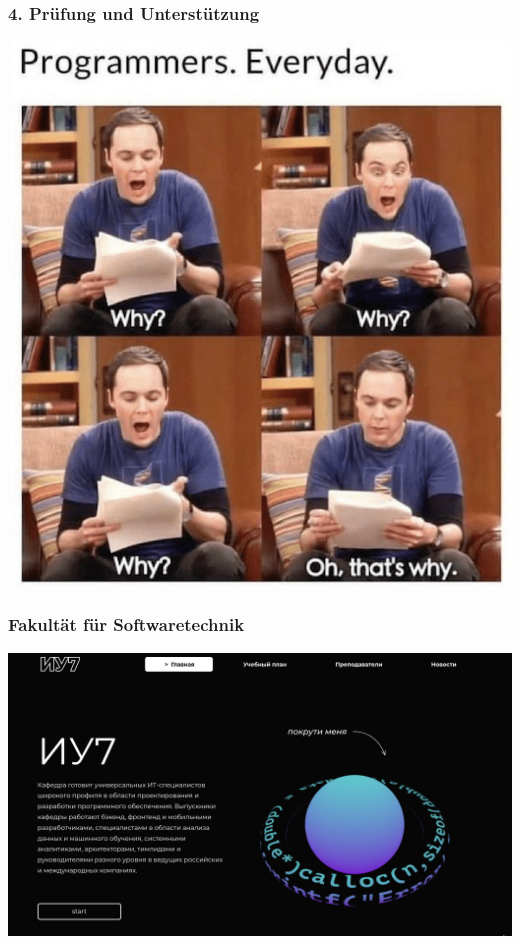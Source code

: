 \documentclass{beamer}
\begin{document}
\begin{frame}
    \frametitle{4. Prüfung und Unterstützung}
    \centering
    \includegraphics[height=0.9\textheight]{img/debugging.png}
\end{frame}

\begin{frame}
    \frametitle{Fakultät für Softwaretechnik}
    \centering
    \includegraphics[width=\textwidth]{img/iu7.png}
\end{frame}
\end{document}
